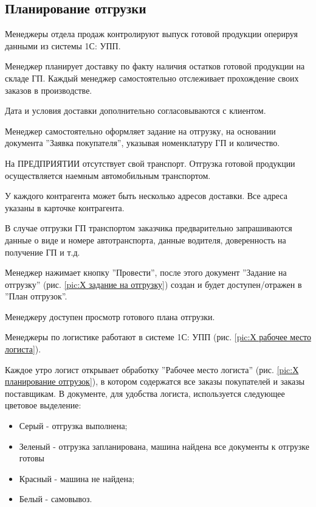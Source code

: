 \newpage
\subsection{Планирование отгрузки}
\label{bp:ShipmentPlanning}

Менеджеры отдела продаж контролируют выпуск готовой продукции оперируя данными из системы 1С: УПП. 

Менеджер планирует доставку по факту наличия остатков готовой продукции на складе ГП.
Каждый менеджер самостоятельно отслеживает прохождение своих заказов в производстве.

Дата и условия доставки дополнительно согласовываются с клиентом.

Менеджер самостоятельно оформляет задание на отгрузку, на основании документа ''Заявка покупателя'', указывая номенклатуру ГП и количество.

На ПРЕДПРИЯТИИ отсутствует свой транспорт. Отгрузка готовой продукции осуществляется наемным автомобильным транспортом.

У каждого контрагента может быть несколько адресов доставки. Все адреса указаны в карточке контрагента.


В случае отгрузки ГП транспортом заказчика предварительно запрашиваются данные о виде и номере автотранспорта, данные водителя, доверенность на получение ГП и т.д.

Менеджер нажимает кнопку ''Провести'', после этого документ ''Задание на отгрузку'' (рис. \ref{pic:Х задание на отгрузку}) создан и будет доступен/отражен в ''План отгрузок''. 

Менеджеру доступен просмотр готового плана отгрузки.

Менеджеры по логистике работают в системе 1С: УПП (рис. \ref{pic:Х рабочее место логиста}).

Каждое утро логист открывает обработку ''Рабочее место логиста'' (рис. \ref{pic:Х планирование отгрузок}), в котором содержатся все заказы покупателей и заказы поставщикам. В документе, для удобства логиста, используется следующее цветовое выделение:

\begin{itemize}
    \item Серый - отгрузка выполнена;
    \item Зеленый - отгрузка запланирована, машина найдена все документы к отгрузке готовы
    \item Красный - машина не найдена;
    \item Белый - самовывоз.
\end{itemize}

